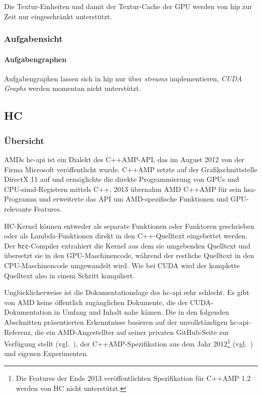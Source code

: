 Die Textur-Einheiten und damit der Textur-Cache der GPU werden von \gls{hip} zur
Zeit nur eingeschränkt unterstützt.

\subsubsection{Aufgabensicht}

\paragraph{Aufgabengraphen}

Aufgabengraphen lassen sich in \gls{hip} nur über \textit{streams}
implementieren, \textit{CUDA Graphs} werden momentan nicht unterstützt.

\subsection{HC}
\label{vergleich:hc}

\subsubsection{Übersicht}

AMDs \gls{hc}-\gls{api} ist ein Dialekt des C++AMP-API, das im August 2012 von
der Firma Microsoft veröffentlicht wurde. C++AMP setzte auf der
Grafikschnittstelle DirectX 11 auf und ermöglichte die direkte Programmierung
von GPUs und CPU-\gls{simd}-Registern mittels C++. 2013 übernahm AMD C++AMP
für sein \gls{hsa}-Programm und erweiterte das API um AMD-spezifische Funktionen
und GPU-relevante Features.

HC-Kernel können entweder als separate Funktionen oder Funktoren geschrieben 
oder als Lambda-Funktionen direkt in den C++-Quelltext eingebettet werden. Der
\texttt{hcc}-Compiler extrahiert die Kernel aus dem sie umgebenden Quelltext
und übersetzt sie in den GPU-Maschinencode, während der restliche Quelltext
in den CPU-Maschinencode umgewandelt wird. Wie bei CUDA wird der komplette
Quelltext also in einem Schritt kompiliert.

Unglücklicherweise ist die Dokumentationslage des \gls{hc}-\gls{api} sehr
schlecht. Es gibt von AMD keine öffentlich zugänglichen Dokumente, die der
CUDA-Dokumentation in Umfang und Inhalt nahe kämen. Die in den folgenden
Abschnitten präsentierten Erkenntnisse basieren auf der unvollständigen
\gls{hc}-\gls{api}-Referenz, die ein AMD-Angestellter auf seiner privaten
GitHub-Seite zur Verfügung stellt (vgl.~\cite{hcref}), der C++AMP-Spezifikation aus
dem Jahr 2012\footnote{Die Features der Ende 2013 veröffentlichten Spezifikation
für C++AMP 1.2 werden von HC nicht unterstützt.} (vgl.~\cite{cppamp2012}) und
eigenen Experimenten.

